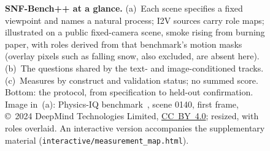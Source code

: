 \begin{figure}[t]
\caption{\textbf{SNF-Bench++ at a glance.} (a)~Each scene specifies a fixed viewpoint and names a natural process; I2V
sources carry role maps; illustrated on a public fixed-camera scene, smoke rising from burning paper, with roles derived from that benchmark's motion masks (overlay pixels such as falling snow, also excluded, are absent here). (b)~The questions shared by the text- and image-conditioned tracks.
(c)~Measures by construct and validation status; no summed score.
Bottom: the protocol, from specification to held-out confirmation. Image in~(a): Physics-IQ benchmark~\cite{motamed2025physicsiq}, scene 0140, first frame, \copyright~2024 DeepMind Technologies Limited, \href{https://creativecommons.org/licenses/by/4.0/}{CC~BY~4.0}; resized, with roles overlaid. An interactive version accompanies the
supplementary material (\texttt{interactive/measurement\_map.html}).}
\label{fig:pp_protocol}
\end{figure}
